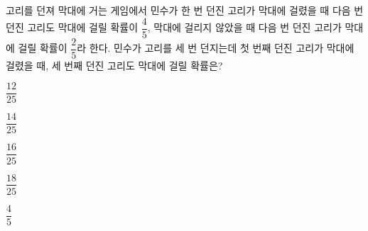 고리를 던져 막대에 거는 게임에서 민수가 한 번 던진 고리가 막대에 걸렸을 때 다음 번 던진 고리도 막대에 걸릴 확률이 $\dfrac{4}{5}$, 막대에 걸리지 않았을 때 다음 번 던진 고리가 막대에 걸릴 확률이 $\dfrac{2}{5}$라 한다. 민수가 고리를 세 번 던지는데 첫 번째 던진 고리가 막대에 걸렸을 때, 세 번째 던진 고리도 막대에 걸릴 확률은?
\begin{choicesii}{\rule[-3ex]{0pt}{8ex}$\dfrac{12}{25}$}{\rule[-3ex]{0pt}{8ex}$\dfrac{14}{25}$}{\rule[-3ex]{0pt}{8ex}$\dfrac{16}{25}$}{\rule[-3ex]{0pt}{8ex}$\dfrac{18}{25}$}{\rule[-3ex]{0pt}{8ex}$\dfrac{4}{5}$}\end{choicesii}
